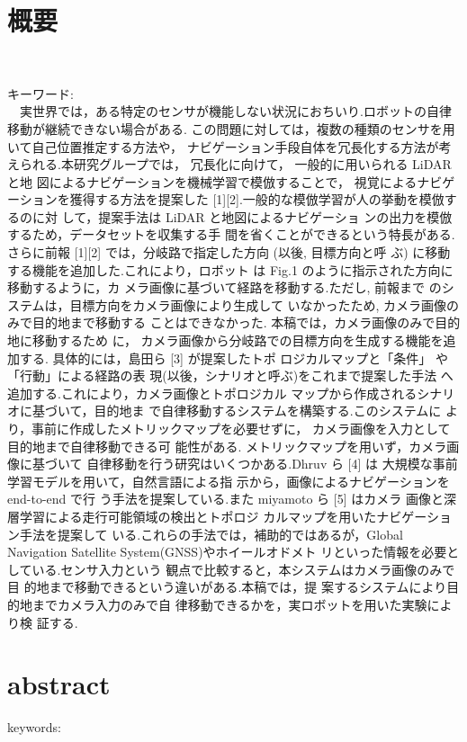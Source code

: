 \chapter*{概要}
\thispagestyle{empty}
%
\begin{center}
  \scalebox{1.5}{タイトル}\\
\end{center}
\vspace{1.0zh}
%


キーワード: \\
%
　実世界では，ある特定のセンサが機能しない状況におちいり.ロボットの自律移動が継続できない場合がある.
この問題に対しては，複数の種類のセンサを用いて自己位置推定する方法や，
ナビゲーション手段自体を冗長化する方法が考えられる.本研究グループでは，
冗長化に向けて，
一般的に用いられる LiDAR と地 図によるナビゲーションを機械学習で模倣することで，
視覚によるナビゲーションを獲得する方法を提案した [1][2].一般的な模倣学習が人の挙動を模倣するのに対 して，提案手法は LiDAR と地図によるナビゲーショ ンの出力を模倣するため，データセットを収集する手 間を省くことができるという特長がある.さらに前報 [1][2] では，分岐路で指定した方向 (以後, 目標方向と呼 ぶ) に移動する機能を追加した.これにより，ロボット は Fig.1 のように指示された方向に移動するように，カ メラ画像に基づいて経路を移動する.ただし, 前報まで のシステムは，目標方向をカメラ画像により生成して いなかったため, カメラ画像のみで目的地まで移動する ことはできなかった.
本稿では，カメラ画像のみで目的地に移動するため に，
カメラ画像から分岐路での目標方向を生成する機能を追加する.
具体的には，島田ら [3] が提案したトポ ロジカルマップと「条件」
や「行動」による経路の表 現(以後，シナリオと呼ぶ)をこれまで提案した手法
へ追加する.これにより，カメラ画像とトポロジカル マップから作成されるシナリオに基づいて，目的地ま で自律移動するシステムを構築する.このシステムに より，事前に作成したメトリックマップを必要せずに，
カメラ画像を入力として目的地まで自律移動できる可 能性がある.
メトリックマップを用いず，カメラ画像に基づいて 自律移動を行う研究はいくつかある.Dhruv ら [4] は 大規模な事前学習モデルを用いて，自然言語による指 示から，画像によるナビゲーションを end-to-end で行 う手法を提案している.また miyamoto ら [5] はカメラ 画像と深層学習による走行可能領域の検出とトポロジ カルマップを用いたナビゲーション手法を提案して いる.これらの手法では，補助的ではあるが，Global Navigation Satellite System(GNSS)やホイールオドメト リといった情報を必要としている.センサ入力という 観点で比較すると，本システムはカメラ画像のみで目 的地まで移動できるという違いがある.本稿では，提 案するシステムにより目的地までカメラ入力のみで自 律移動できるかを，実ロボットを用いた実験により検 証する.
\newpage
\chapter*{abstract}
\thispagestyle{empty}
%
\begin{center}
  \scalebox{1.3}{title}
\end{center}
\vspace{1.0zh}
%


keywords: 
